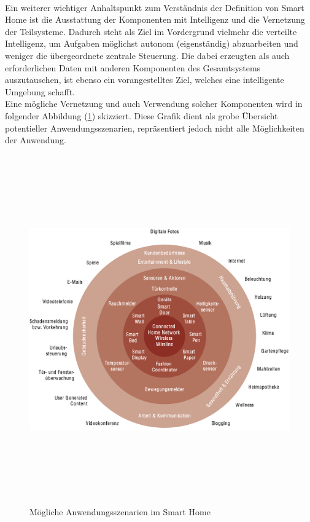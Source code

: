         \\
        \linebreak
        Ein weiterer wichtiger Anhaltspunkt zum Verständnis der Definition von Smart Home ist die Ausstattung der Komponenten mit Intelligenz und die 
        Vernetzung der Teilsysteme. Dadurch steht als Ziel im Vordergrund vielmehr die verteilte 
        Intelligenz, um Aufgaben möglichst autonom (eigenständig) abzuarbeiten und weniger die übergeordnete zentrale Steuerung. 
        Die dabei erzeugten als auch erforderlichen Daten mit anderen 
        Komponenten des Gesamtsystems auszutauschen, ist ebenso ein vorangestelltes Ziel, welches eine intelligente Umgebung schafft. 
        \\
        Eine mögliche Vernetzung und auch Verwendung solcher Komponenten wird in folgender Abbildung (\ref{pic:szenarien-smarhome}) 
        skizziert. Diese Grafik dient als grobe Übersicht potentieller Anwendungsszenarien, repräsentiert jedoch nicht alle Möglichkeiten der Anwendung. %
        \begin{figure}[hbt!]
            \centering
            \includegraphics[width=15cm,height=15cm,keepaspectratio]{images/Anwendungsszenarien_SH.png}
            \caption{Mögliche Anwendungsszenarien im Smart Home \cite{strese.2010m}}
            \label{pic:szenarien-smarhome}
        \end{figure}
